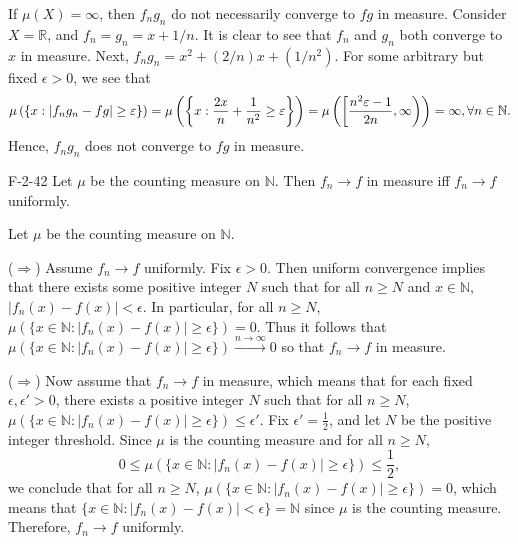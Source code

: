 \documentclass{article}
\begin{document}
\begin{enumerate}[itemsep =-2pt, label = (\alph{*})]
		If $\mu(X) = \infty$, then $f_{n}g_{n}$ do not necessarily converge to $fg$ in measure. Consider $X = \mathbb{R}$, and $f_{n} = g_{n} = x + 1/n$. It is clear to see that $f_{n}$ and $g_{n}$ both converge to $x$ in measure. Next, $f_{n}g_{n} = x^{2} + (2/n)x + (1/n^{2})$. For some arbitrary but fixed $\epsilon > 0$, we see that 
		\begin{equation}
			\mu\left(\left\{x: \left| f_{n}g_{n} - fg \right|\geq \varepsilon\right\}\right) = \mu\left(\left\{x: \frac{2x}{n} + \frac{1}{n^{2}} \geq \varepsilon\right\}\right) = \mu\left(\left[\frac{n^{2}\varepsilon - 1}{2n}, \infty\right)\right) = \infty, \forall n \in \mathbb{N}. 
		\end{equation}
		Hence, $f_{n}g_{n}$ does not converge to $fg$ in measure. 
	\end{enumerate}
	
	\begin{prb}{F-2-42}
		Let $\mu$ be the counting measure on $\mathbb{N}$. Then $f_{n} \to f$ in measure iff $f_{n} \to f$ uniformly. 
	\end{prb}
	Let $\mu$ be the counting measure on $\mathbb{N}$. 
	
	($\Longrightarrow$) Assume $f_{n} \to f$ uniformly. Fix $\epsilon > 0$. Then uniform convergence implies that there exists some positive integer $N$ such that for all $n \geq N$ and $x \in \mathbb{N}$, $|f_{n}(x) - f(x)| < \epsilon$. In particular, for all $n \geq N$, $\mu(\{x \in \mathbb{N}: |f_{n}(x) - f(x)| \geq \epsilon\}) = 0$. Thus it follows that $\mu(\{x \in \mathbb{N}: |f_{n}(x) - f(x)| \geq \epsilon\}) \xrightarrow{n \to \infty} 0$ so that $f_{n} \to f$ in measure. 
	
	($\Longrightarrow$) Now assume that $f_{n} \to f$ in measure, which means that for each fixed $\epsilon, \epsilon' > 0$, there exists a positive integer $N$ such that for all $n \geq N$, $\mu(\{x \in \mathbb{N}: |f_{n}(x) - f(x)| \geq \epsilon\}) \leq \epsilon'$. Fix $\epsilon' = \frac{1}{2}$, and let $N$ be the positive integer threshold. Since $\mu$ is the counting measure and for all $n \geq N$, 
	\begin{equation*}
		0 \leq \mu(\{x \in \mathbb{N}: |f_{n}(x) - f(x)| \geq \epsilon\}) \leq \frac{1}{2}, 
	\end{equation*}
	we conclude that for all $n \geq N$, $\mu(\{x \in \mathbb{N}: |f_{n}(x) - f(x)| \geq \epsilon\}) = 0$, which means that $\{x \in \mathbb{N}: |f_{n}(x) - f(x)| < \epsilon\} = \mathbb{N}$ since $\mu$ is the counting measure. Therefore, $f_{n} \to f$ uniformly. 
	
\end{document}
